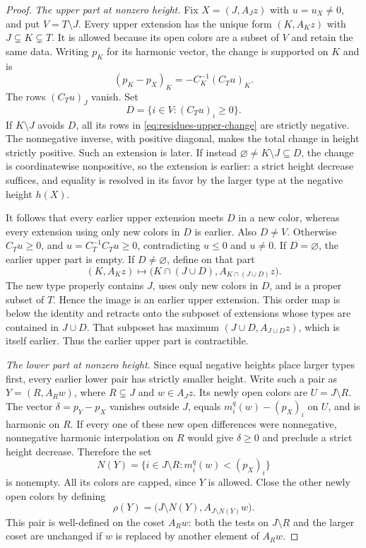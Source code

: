 \begin{proof}
\medskip\noindent
\textit{The upper part at nonzero height.}
Fix $X=(J,A_Jz)$ with $u=u_X\ne0$, and put $V=T\setminus J$.
Every upper extension has the unique form
$(K,A_Kz)$ with $J\subsetneq K\subsetneq T$.  It is allowed because
its open colors are a subset of $V$ and retain the same data.
Writing $p_K$ for its harmonic vector, the change is supported on
$K$ and is
\begin{equation}
 \label{eq:residues-upper-change}
 (p_K-p_X)_K=-C_K^{-1}(C_Tu)_K.
\end{equation}
The rows $(C_Tu)_J$ vanish.  Set
\[
 D=\{i\in V:(C_Tu)_i\ge0\}.
\]
If $K\setminus J$ avoids $D$, all its rows in
\eqref{eq:residues-upper-change} are strictly negative.  The
nonnegative inverse, with positive diagonal, makes the total change
in height strictly positive.  Such an extension is later.  If instead
$\varnothing\ne K\setminus J\subseteq D$, the change is
coordinatewise nonpositive, so the extension is earlier: a strict
height decrease suffices, and equality is resolved in its favor by
the larger type at the negative height $h(X)$.

It follows that every earlier upper extension meets $D$ in a new
color, whereas every extension using only new colors in $D$ is
earlier.  Also $D\ne V$.  Otherwise $C_Tu\ge0$, and
$u=C_T^{-1}C_Tu\ge0$, contradicting $u\le0$ and $u\ne0$.
If $D=\varnothing$, the earlier upper part is empty.  If
$D\ne\varnothing$, define on that part
\[
 (K,A_Kz)\longmapsto
 \bigl(K\cap(J\cup D),A_{K\cap(J\cup D)}z\bigr).
\]
The new type properly contains $J$, uses only new colors in $D$,
and is a proper subset of $T$.  Hence the image is an earlier upper
extension.  This order map is below the identity and retracts onto
the subposet of extensions whose types are contained in $J\cup D$.
That subposet has maximum $(J\cup D,A_{J\cup D}z)$, which is itself
earlier.  Thus the earlier upper part is contractible.

\medskip\noindent
\textit{The lower part at nonzero height.}
Since equal negative heights place larger types first, every earlier
lower pair has strictly smaller height.  Write such a pair as
$Y=(R,A_Rw)$, where $R\subsetneq J$ and $w\in A_Jz$.
Its newly open colors are $U=J\setminus R$.  The vector
$\delta=p_Y-p_X$ vanishes outside $J$, equals
$m_i^q(w)-(p_X)_i$ on $U$, and is harmonic on $R$.  If every one
of these new open differences were nonnegative, nonnegative harmonic
interpolation on $R$ would give $\delta\ge0$ and preclude a strict
height decrease.  Therefore the set
\[
 N(Y)=\{i\in J\setminus R:m_i^q(w)<(p_X)_i\}
\]
is nonempty.  All its colors are capped, since $Y$ is allowed.
Close the other newly open colors by defining
\begin{equation}
 \label{eq:residues-lower-retraction}
 \rho(Y)=\bigl(J\setminus N(Y),A_{J\setminus N(Y)}w\bigr).
\end{equation}
This pair is well-defined on the coset $A_Rw$: both the tests on
$J\setminus R$ and the larger coset are unchanged if $w$ is
replaced by another element of $A_Rw$.


\end{proof}
